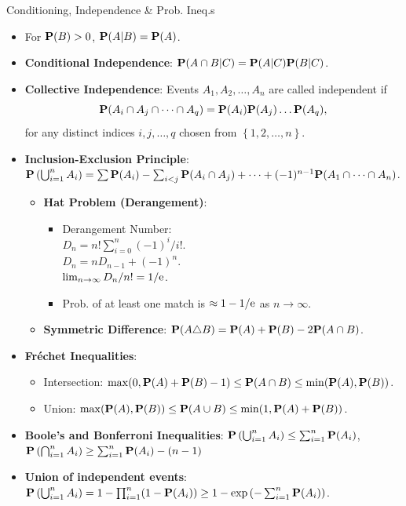 \documentclass[landscape,a4paper]{article}
\begin{document}
\begin{cheatsheetcolumns}
\begin{card}{Conditioning, Independence \& Prob. Ineq.s}
\begin{itemize}
			\item For $\mathbf{P}(B)>0$, $\mathbf{P}(A|B)=\mathbf{P}(A)$.
			\item \textbf{Conditional Independence}: $\mathbf{P}(A\cap B|C)=\mathbf{P}(A|C)\mathbf{P}(B|C)$.
			\item \textbf{Collective Independence}: Events $A_1,A_2,\dots, A_n$ are called independent if
			\[
			\mathbf{P}(A_i\cap A_j\cap \dots\cap A_q)=\mathbf{P}(A_i)\mathbf{P}(A_j)\dots\mathbf{P}(A_q),
			\]
			for any distinct indices $i,j,\dots,q$ chosen from $\left\{1,2,\dots,n\right\}$.
			\item \textbf{Inclusion-Exclusion Principle}:
			$\mathbf{P}\left(\bigcup_{i=1}^n A_i\right) = \sum \mathbf{P}(A_i) - \sum_{i<j} \mathbf{P}(A_i \cap A_j) + \dots + (-1)^{n-1} \mathbf{P}(A_1 \cap \dots \cap A_n)$.
			\begin{itemize}
				\item \textbf{Hat Problem (Derangement)}: 
				\begin{itemize}
					\item Derangement Number:\\ $D_n=n!\sum_{i=0}^n(-1)^i/i!$.\\
					$D_n=nD_{n-1}+(-1)^n$.\\
					$\lim_{n\to\infty} D_n/n!=1/\mathrm{e}$.
					\item Prob. of at least one match is $\approx 1 - 1/\mathrm{e}$ as $n\to\infty$.
				\end{itemize}
				\item \textbf{Symmetric Difference}: $\mathbf{P}(A \triangle B) = \mathbf{P}(A) + \mathbf{P}(B) - 2\mathbf{P}(A \cap B)$.
			\end{itemize}
			\end{itemize}
			\begin{itemize}
				\item \textbf{Fréchet Inequalities}:
				\begin{itemize}
					\item Intersection: $\max(0, \mathbf{P}(A) + \mathbf{P}(B) - 1) \leq \mathbf{P}(A \cap B) \leq \min(\mathbf{P}(A), \mathbf{P}(B))$.
					\item Union: $\max(\mathbf{P}(A), \mathbf{P}(B)) \leq \mathbf{P}(A \cup B) \leq \min(1, \mathbf{P}(A) + \mathbf{P}(B))$.
				\end{itemize}
				\item \textbf{Boole's and Bonferroni Inequalities}: $\mathbf{P}\left(\bigcup_{i=1}^n A_i\right) \leq \sum_{i=1}^n \mathbf{P}(A_i)$,\\ $\mathbf{P}\left(\bigcap_{i=1}^n A_i\right) \geq \sum_{i=1}^n \mathbf{P}(A_i) - (n - 1)$
				\item \textbf{Union of independent events}:\\$\mathbf{P}\left(\bigcup_{i=1}^n A_i\right) = 1 - \prod_{i=1}^n (1 - \mathbf{P}(A_i)) \geq 1 - \exp\left(-\sum_{i=1}^n \mathbf{P}(A_i)\right)$.

\end{itemize}
\end{card}
\end{cheatsheetcolumns}
\end{document}
